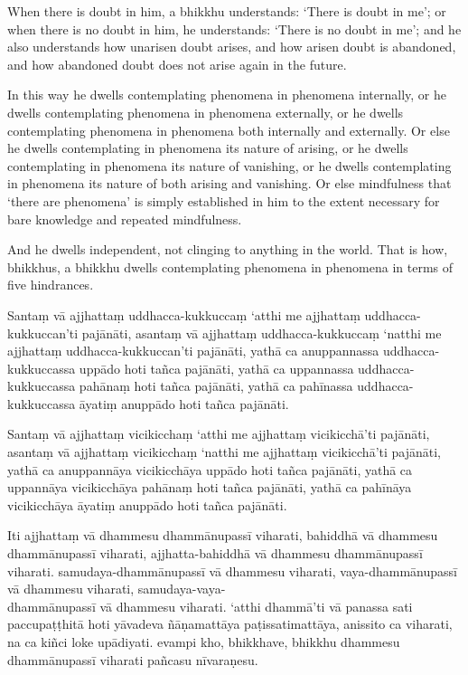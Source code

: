 When there is doubt in him, a bhikkhu understands:
`There is doubt in me';
or when there is no doubt in him, he understands:
`There is no doubt in me';
and he also understands how unarisen doubt arises,
and how arisen doubt is abandoned,
and how abandoned doubt does not arise again in the future.

In this way he dwells contemplating phenomena in phenomena internally, or he
dwells contemplating phenomena in phenomena externally, or he dwells
contemplating phenomena in phenomena both internally and externally. Or else he
dwells contemplating in phenomena its nature of arising, or he dwells
contemplating in phenomena its nature of vanishing, or he dwells contemplating
in phenomena its nature of both arising and vanishing. Or else mindfulness that
‘there are phenomena’ is simply established in him to the extent necessary for
bare knowledge and repeated mindfulness.

And he dwells independent, not clinging to anything in the world. That is how,
bhikkhus, a bhikkhu dwells contemplating phenomena in phenomena in terms of five
hindrances.


\paliPage

Santaṃ vā ajjhattaṃ uddhacca-kukkuccaṃ ‘atthi me ajjhattaṃ uddhacca-kukkuccan’ti pajānāti,
asantaṃ vā ajjhattaṃ uddhacca-kukkuccaṃ ‘natthi me ajjhattaṃ uddhacca-kukkuccan’ti pajānāti,
yathā ca anuppannassa uddhacca-kukkuccassa uppādo hoti tañca pajānāti,
yathā ca uppannassa uddhacca-kukkuccassa pahānaṃ hoti tañca pajānāti,
yathā ca pahīnassa uddhacca-kukkuccassa āyatiṃ anuppādo hoti tañca pajānāti.

Santaṃ vā ajjhattaṃ vicikicchaṃ ‘atthi me ajjhattaṃ vicikicchā’ti pajānāti,
asantaṃ vā ajjhattaṃ vicikicchaṃ ‘natthi me ajjhattaṃ vicikicchā’ti pajānāti,
yathā ca anuppannāya vicikicchāya uppādo hoti tañca pajānāti,
yathā ca uppannāya vicikicchāya pahānaṃ hoti tañca pajānāti,
yathā ca pahīnāya vicikicchāya āyatiṃ anuppādo hoti tañca pajānāti.

Iti ajjhattaṃ vā dhammesu dhammānupassī viharati,
bahiddhā vā dhammesu dhammānupassī viharati,
ajjhatta-bahiddhā vā dhammesu dhammānupassī viharati.
samudaya-dhammānupassī vā dhammesu viharati,
vaya-dhammānupassī vā dhammesu viharati,
samudaya-vaya-\\ dhammānupassī vā dhammesu viharati.
‘atthi dhammā’ti vā panassa sati paccupaṭṭhitā hoti
yāvadeva ñāṇamattāya paṭissatimattāya, anissito ca viharati,
na ca kiñci loke upādiyati. evampi kho, bhikkhave, bhikkhu
dhammesu dhammānupassī viharati pañcasu nīvaraṇesu.

